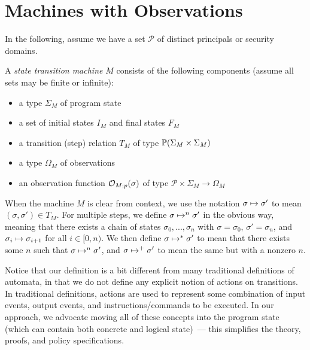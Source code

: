 \section{Machines with Observations}
\label{methodology-machine}

In the following, assume we have a set $\mathcal{P}$ of distinct 
principals or security domains.

\begin{definition}[Machine]
A \emph{state transition machine} $M$ consists 
of the following components (assume all sets may be finite or infinite):
\newpage
\begin{itemize} \itemsep 0pt
\item a type $\Sigma_M$ of program state
\item a set of initial states $I_M$ and final states $F_M$
\item a transition (step) relation $T_M$ of type 
$\mathbb{P}(\Sigma_M \times \Sigma_M)$
\item a type $\Omega_M$ of observations
\item an observation function $\mathcal{O}_{M;p}(\sigma)$ 
of type $\mathcal{P} \times \Sigma_M \to \Omega_M$
\end{itemize}
\end{definition}

\noindent
When the machine $M$ is clear from context, 
we use the notation $\sigma \mapsto \sigma'$ to mean
$(\sigma,\sigma') \in T_M$.
For multiple steps, we define $\sigma \mapsto^n \sigma'$ in
the obvious way, meaning that there exists a chain of states
$\sigma_0,...,\sigma_n$ with $\sigma = \sigma_0$, $\sigma' = \sigma_n$,
and $\sigma_i \mapsto \sigma_{i+1}$ for all $i \in [0,n)$.
We then define $\sigma \mapsto^* \sigma'$ to mean that there exists 
some $n$ such that $\sigma \mapsto^n \sigma'$, and
$\sigma \mapsto^+ \sigma'$ to mean the same but with a nonzero $n$.

Notice that our definition is a bit different from many traditional
definitions of automata, in that we do not define any explicit notion of 
actions on transitions. In traditional definitions, actions are used
to represent some combination of input events, output events, and
instructions/commands to be executed. In our approach, we advocate moving 
all of these concepts into the program state (which can contain both
concrete and logical state)~--- this simplifies the theory,
proofs, and policy specifications.

